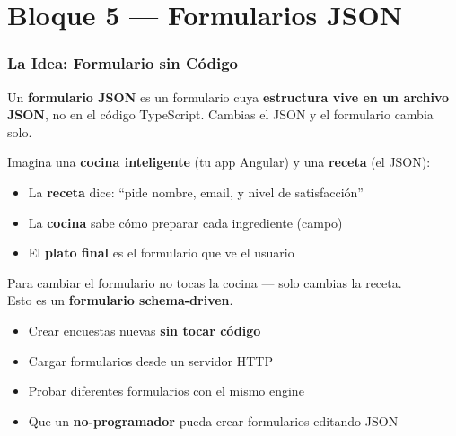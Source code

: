 \documentclass[12pt, a4paper]{article}
\begin{document}
\newpage
\part{ Bloque 5 --- Formularios JSON}

\section{  La Idea: Formulario sin Código}

Un \textbf{formulario JSON} es un formulario cuya \textbf{estructura vive en un archivo JSON},
no en el código TypeScript. Cambias el JSON y el formulario cambia solo.

\begin{tcolorbox}[analogia, title={\emoji{cook} \emoji{memo} La Receta vs. La Cocina}]
  Imagina una \textbf{cocina inteligente} (tu app Angular) y una \textbf{receta} (el JSON):
  \begin{itemize}
    \item {} La \textbf{receta} dice: ``pide nombre, email, y nivel de satisfacción''
    \item {} La \textbf{cocina} sabe cómo preparar cada ingrediente (campo)
    \item {} El \textbf{plato final} es el formulario que ve el usuario
  \end{itemize}
  Para cambiar el formulario no tocas la cocina --- solo cambias la receta.\\[0.3cm]
   Esto es un \textbf{formulario schema-driven}.
\end{tcolorbox}

\begin{tcolorbox}[importante, title={\emoji{question} \emoji{light-bulb} ¿Para qué sirve esto?}]
  \begin{itemize}
    \item {} Crear encuestas nuevas \textbf{sin tocar código}
    \item {} Cargar formularios desde un servidor HTTP
    \item {} Probar diferentes formularios con el mismo engine
    \item {} Que un \textbf{no-programador} pueda crear formularios editando JSON
  \end{itemize}
\end{tcolorbox}
\end{document}
